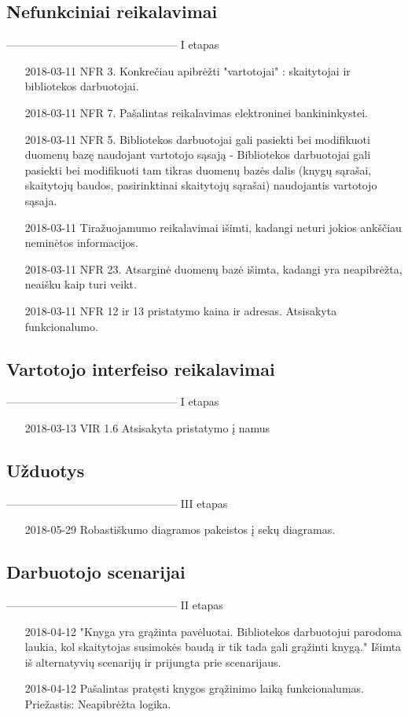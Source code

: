 \documentclass{VUMIFPSkursinis}
\begin{document}
\subsection{Nefunkciniai reikalavimai}
----------------------------------------------- I etapas
\begin{enumerate}
	\item [2018-03-11] NFR 3. Konkrečiau apibrėžti "vartotojai" : skaitytojai ir bibliotekos darbuotojai.
    \item [2018-03-11] NFR 7. Pašalintas reikalavimas elektroninei bankininkystei.
	\item [2018-03-11] NFR 5. Bibliotekos darbuotojai gali pasiekti bei modifikuoti duomenų bazę
naudojant vartotojo sąsają - Bibliotekos darbuotojai gali pasiekti bei modifikuoti tam tikras duomenų bazės dalis (knygų sąrašai, skaitytojų baudos, pasirinktinai skaitytojų sąrašai) naudojantis vartotojo sąsaja.
	\item [2018-03-11] Tiražuojamumo reikalavimai išimti, kadangi neturi jokios ankščiau neminėtos informacijos.
    \item [2018-03-11] NFR 23. Atsarginė duomenų bazė išimta, kadangi yra neapibrėžta, neaišku kaip turi veikt.
    \item [2018-03-11] NFR 12 ir 13 pristatymo kaina ir adresas. Atsisakyta funkcionalumo.
    \end{enumerate}

\subsection{Vartotojo interfeiso reikalavimai}
----------------------------------------------- I etapas
\begin{enumerate}
	\item [2018-03-13] VIR 1.6 Atsisakyta pristatymo į namus
\end{enumerate}

\subsection{Užduotys}
----------------------------------------------- III etapas
\begin{enumerate}
	\item [2018-05-29] Robastiškumo diagramos pakeistos į sekų diagramas.
\end{enumerate}


\subsection{Darbuotojo scenarijai} 
----------------------------------------------- II etapas
\begin{enumerate}
\item [2018-04-12] "Knyga yra grąžinta pavėluotai. Bibliotekos darbuotojui parodoma laukia, kol skaitytojas susimokės baudą ir tik tada gali grąžinti knygą." Išimta iš alternatyvių scenarijų ir prijungta prie scenarijaus.
\item [2018-04-12] Pašalintas pratęsti knygos grąžinimo laiką funkcionalumas. Priežastis: Neapibrėžta logika.
\end{enumerate}
\end{document}
